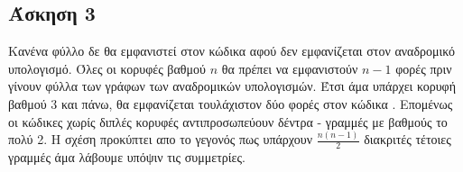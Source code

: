\newpage\subsection*{Άσκηση 3}
Κανένα φύλλο δε θα εμφανιστεί στον κώδικα  αφού δεν εμφανίζεται
στον αναδρομικό υπολογισμό. Όλες οι κορυφές βαθμού $n$ θα πρέπει να εμφανιστούν $n-1$ φορές πριν γίνουν φύλλα
των γράφων των αναδρομικών υπολογισμών. Έτσι άμα υπάρχει κορυφή βαθμού 3 και πάνω, θα εμφανίζεται τουλάχιστον δύο φορές 
στον κώδικα . Επομένως οι κώδικες  χωρίς διπλές κορυφές αντιπροσωπεύουν δέντρα - γραμμές με βαθμούς το πολύ 2.
Η σχέση προκύπτει απο το γεγονός πως υπάρχουν $ \frac{n(n-1)}{2} $ διακριτές τέτοιες γραμμές άμα λάβουμε υπόψιν τις συμμετρίες. 
